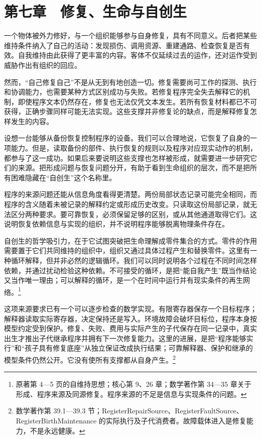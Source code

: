 \documentclass[
  11pt,
  oneside]{book}
\begin{document}
\par\endgroup

\chapter{第七章　修复、生命与自创生}\label{ph-ch-07}

一个物体被外力修好，与一个组织能够参与自身修复，具有不同意义。后者把某些维持条件纳入了自己的活动：发现损伤、调用资源、重建通路、检查恢复是否有效。自我维持由此获得了更丰富的内容。客体不仅延续过去的运作，还对运作受到威胁作出有组织的回应。

然而，``自己修复自己''不是从无到有地创造一切。修复需要尚可工作的探测、执行和协调能力，也需要某种方式区别成功与失败。若修复程序完全失去解释它的机制，即使程序文本仍然存在，修复也无法仅凭文本发生。若所有恢复材料都已不可获得，正确步骤同样可能无法实现。这些支撑并非修复论的缺点，而是解释修复怎样发生的内容。

设想一台能够从备份恢复控制程序的设备。我们可以合理地说，它恢复了自身的一项能力。但是，读取备份的部件、执行恢复的规则以及程序对应现实动作的机制，都参与了这一成功。如果后来要说明这些支撑也怎样被形成，就需要进一步研究它们的来源。把形成问题与恢复问题分开，有助于看到生命组织的层次，而不是把所有困难隐藏在``自创生''这个名称里。

程序的来源问题还能从信息角度看得更清楚。两份局部状态记录可能完全相同，而程序的含义随着未被记录的解释约定或形成历史改变。只读取这份局部记录，就无法区分两种要求。要可靠恢复，必须保留足够的区别，或从其他通道取得它们。这说明恢复依赖信息与实现的组织，并不说明程序能够脱离物理条件存在。

自创生的哲学吸引力，在于它试图突破把生命理解成零件集合的方式。零件的作用需要置于它们共同维持的组织中，组织又通过具体过程产生和替换零件。这里有一种循环解释，但并非必然的逻辑循环。我们可以同时说明各个过程在不同时间怎样依赖，并通过扰动检验这种依赖。不可接受的循环，是把``能自我产生''既当作结论又当作唯一理由；可以解释的循环，是一个在时间中运行并有现实条件的再生网络。\footnote{\hypertarget{ph-note-15}{}原著第 4---5 页的自维持思想；核心第 9、26 章；数学著作第 34---35 章关于形成、程序来源及同源修复。程序来源的不足是信息与实现条件的问题。}

这项来源要求已有一个可以逐步检查的数学实现。有限寄存器保存一个目标程序；解释器读取实际寄存器，决定保持还是写入。环境故障会破坏目标位，程序本身按模型约定受到保护。修复、失败、费用与实际产生的子代保存在同一记录中，真实出生才推出子代继承程序并拥有下一次修复能力。这里的进展，是把``程序能够实行''和``孩子具有修复底座''从独立保证改成执行结果；可靠解释器、保护和继承的模型条件仍然公开。它没有使所有支撑都从自身产生。\footnote{\hypertarget{ph-note-16}{}数学著作第 39.1---39.3 节；RegisterRepairSource、RegisterFaultSource、RegisterBirthMaintenance 的实际执行及子代消费者。故障载体进入是修复能力，不是永远健康。}
\end{document}
